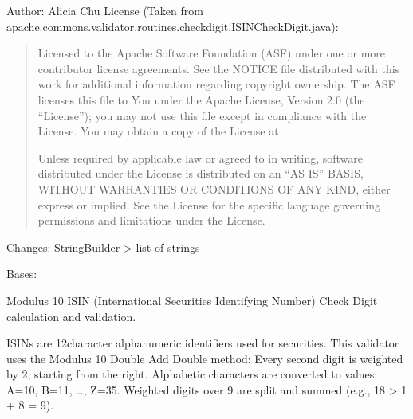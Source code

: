 \documentclass[letterpaper,10pt,english]{sphinxmanual}
\begin{document}
\sphinxAtStartPar
Author: Alicia Chu
License (Taken from apache.commons.validator.routines.checkdigit.ISINCheckDigit.java):
\begin{quote}

\sphinxAtStartPar
Licensed to the Apache Software Foundation (ASF) under one or more
contributor license agreements. See the NOTICE file distributed with
this work for additional information regarding copyright ownership.
The ASF licenses this file to You under the Apache License, Version 2.0
(the “License”); you may not use this file except in compliance with
the License. You may obtain a copy of the License at
\begin{quote}

\sphinxAtStartPar
{}
\end{quote}

\sphinxAtStartPar
Unless required by applicable law or agreed to in writing, software
distributed under the License is distributed on an “AS IS” BASIS,
WITHOUT WARRANTIES OR CONDITIONS OF ANY KIND, either express or implied.
See the License for the specific language governing permissions and
limitations under the License.
\end{quote}

\sphinxAtStartPar
Changes:
\sphinxhyphen{} StringBuilder \sphinxhyphen{}\textgreater{} list of strings

\begin{fulllineitems}
\label{\detokenize{apache_commons_validator_python.routines.checkdigit:apache_commons_validator_python.routines.checkdigit.isin_checkdigit.ISINCheckDigit}}
\pysigstartsignatures
{}
\pysigstopsignatures
\sphinxAtStartPar
Bases: 

\sphinxAtStartPar
Modulus 10 ISIN (International Securities Identifying Number) Check Digit
calculation and validation.

\sphinxAtStartPar
ISINs are 12\sphinxhyphen{}character alphanumeric identifiers used for securities.
This validator uses the Modulus 10 Double Add Double method:
\sphinxhyphen{} Every second digit is weighted by 2, starting from the right.
\sphinxhyphen{} Alphabetic characters are converted to values: A=10, B=11, …, Z=35.
\sphinxhyphen{} Weighted digits over 9 are split and summed (e.g., 18 \sphinxhyphen{}\textgreater{} 1 + 8 = 9).

\end{fulllineitems}
\end{document}
